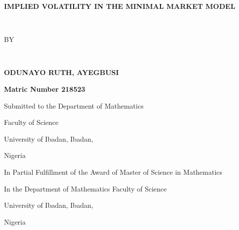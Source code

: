 \documentclass[a4 paper, 12pt]{report}
\theoremstyle{plain}
\begin{document}
	 \baselineskip 29pt
\newcommand{\disp}{\displaystyle}
\thispagestyle{empty}




\begin{center}
	\textbf{\large{IMPLIED VOLATILITY IN THE MINIMAL MARKET MODEL}}
\end{center}
\ \
\begin{center}
	
	BY
\end{center}
\ \
\begin{center}
	\textbf{\large{ODUNAYO RUTH, AYEGBUSI}}
\end{center}
\begin{center}
	\textbf{Matric Number 218523}
\end{center}
\begin{center}
	Submitted to the Department of  Mathematics
\end{center}
\begin{center}
	Faculty of Science  
\end{center}
\begin{center}
	University of Ibadan, Ibadan,  
\end{center}
\begin{center}
	Nigeria  
\end{center}
\begin{center}
	In Partial Fulfillment of the Award of Master of Science in Mathematics
\end{center}
\begin{center}
	In the Department of Mathematics Faculty of Science
\end{center}
\begin{center}
	University of Ibadan, Ibadan,  
\end{center}
\begin{center}
	Nigeria  
\end{center}
\end{document}
